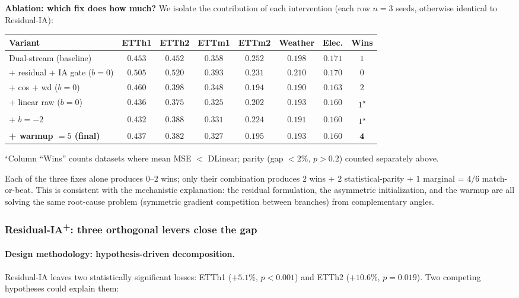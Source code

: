 \documentclass{article}
\begin{document}
\textbf{Ablation: which fix does how much?} We isolate the contribution of each intervention (each row $n{=}3$ seeds, otherwise identical to Residual-IA):

\begin{center}
\footnotesize
\begin{tabular}{@{}lcccccc|c@{}}
\toprule
Variant & ETTh1 & ETTh2 & ETTm1 & ETTm2 & Weather & Elec. & Wins \\
\midrule
Dual-stream (baseline)       & $0.453$ & $0.452$ & $0.358$ & $0.252$ & $\mathbf{0.198}$ & $0.171$ & $1$ \\
+ residual + IA gate ($b{=}0$) & $0.505$ & $0.520$ & $0.393$ & $0.231$ & $0.210$ & $0.170$ & $0$ \\
+ cos + wd ($b{=}0$)         & $0.460$ & $0.398$ & $0.348$ & $\mathbf{0.194}$ & $0.190$ & $0.163$ & $2$ \\
+ linear raw ($b{=}0$)  & $0.436$ & $0.375$ & $0.325$ & $0.202$ & $0.193$ & $0.160$ & $1$\textsuperscript{$\star$} \\
+ $b{=}{-}2$                 & $0.432$ & $0.388$ & $0.331$ & $0.224$ & $0.191$ & $0.160$ & $1$\textsuperscript{$\star$} \\
\textbf{+ warmup $=5$ (final)} & $\mathbf{0.437}$ & $\mathbf{0.382}$ & $\mathbf{0.327}$ & $0.195$ & $0.193$ & $\mathbf{0.160}$ & $\mathbf{4}$ \\
\bottomrule
\end{tabular}
\end{center}
{\scriptsize $^{\star}$Column ``Wins'' counts datasets where mean MSE $<$ DLinear; parity (gap ${<}2\%$, $p{>}0.2$) counted separately above.}

Each of the three fixes alone produces $0$--$2$ wins; only their combination produces $2$ wins + $2$ statistical-parity + $1$ marginal = $4/6$ match-or-beat. This is consistent with the mechanistic explanation: the residual formulation, the asymmetric initialization, and the warmup are all solving the same root-cause problem (symmetric gradient competition between branches) from complementary angles.

\subsubsection*{Residual-IA\textsuperscript{+}: three orthogonal levers close the gap}

\paragraph{Design methodology: hypothesis-driven decomposition.} Residual-IA leaves two statistically significant losses: ETTh1 ($+5.1\%$, $p{<}0.001$) and ETTh2 ($+10.6\%$, $p{=}0.019$). Two competing hypotheses could explain them:
\end{document}
